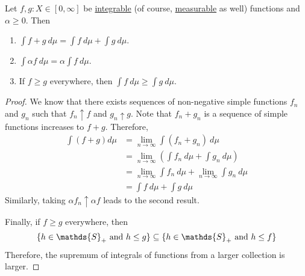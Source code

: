 \documentclass[11pt]{article}
\begin{document}
	\begin{proposition}
		Let $f, g: X \in [0, \infty]$ be \ul{integrable} (of course, \ul{measurable} as well) functions and $\alpha \geq 0$. Then
		\begin{enumerate}
			\item $\int f+g\ d\mu = \int f\ d\mu + \int g\ d\mu$.
			\item $\int \alpha f\ d\mu = \alpha \int f\ d\mu$.
			\item If $f \geq g$ everywhere, then $\int f\ d\mu \geq \int g\ d\mu$.
		\end{enumerate}
		\begin{proof}
			We know that there exists sequences of non-negative simple functions $f_n$ and $g_n$ such that $f_n \uparrow f$ and $g_n \uparrow g$. Note that $f_n + g_n$ is a sequence of simple functions increases to $f + g$. Therefore,
			\begin{align}
				\int (f + g) d \mu &= \lim_{n \to \infty} \int (f_n + g_n)\ d\mu \\
				&= \lim_{n \to \infty} \left(\int f_n\ d\mu + \int g_n\ d\mu \right) \\
				&= \lim_{n \to \infty} \int f_n\ d\mu + \lim_{n \to \infty}  \int g_n\ d\mu \\
				&= \int f\ d\mu + \int g\ d\mu
			\end{align}
			Similarly, taking $\alpha f_n \uparrow \alpha f$ leads to the second result.
			
			Finally, if $f \geq g$ everywhere, then 
			\begin{align}
				\{h \in \mathds{S}_+ \tx{ and } h \leq g\} \subseteq \{h \in \mathds{S}_+ \tx{ and } h \leq f\}
			\end{align}
			Therefore, the supremum of integrals of functions from a larger collection is larger.
		\end{proof}
	\end{proposition}
	
\end{document}
